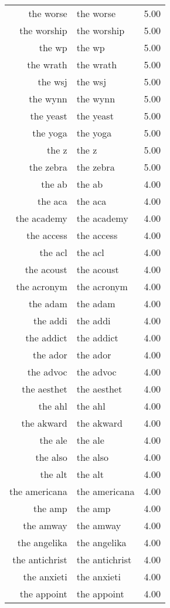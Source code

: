 \begin{table}[ht]
\begin{tabular}{rlr}
  the worse & the worse & 5.00 \\ 
  the worship & the worship & 5.00 \\ 
  the wp & the wp & 5.00 \\ 
  the wrath & the wrath & 5.00 \\ 
  the wsj & the wsj & 5.00 \\ 
  the wynn & the wynn & 5.00 \\ 
  the yeast & the yeast & 5.00 \\ 
  the yoga & the yoga & 5.00 \\ 
  the z & the z & 5.00 \\ 
  the zebra & the zebra & 5.00 \\ 
  the ab & the ab & 4.00 \\ 
  the aca & the aca & 4.00 \\ 
  the academy & the academy & 4.00 \\ 
  the access & the access & 4.00 \\ 
  the acl & the acl & 4.00 \\ 
  the acoust & the acoust & 4.00 \\ 
  the acronym & the acronym & 4.00 \\ 
  the adam & the adam & 4.00 \\ 
  the addi & the addi & 4.00 \\ 
  the addict & the addict & 4.00 \\ 
  the ador & the ador & 4.00 \\ 
  the advoc & the advoc & 4.00 \\ 
  the aesthet & the aesthet & 4.00 \\ 
  the ahl & the ahl & 4.00 \\ 
  the akward & the akward & 4.00 \\ 
  the ale & the ale & 4.00 \\ 
  the also & the also & 4.00 \\ 
  the alt & the alt & 4.00 \\ 
  the americana & the americana & 4.00 \\ 
  the amp & the amp & 4.00 \\ 
  the amway & the amway & 4.00 \\ 
  the angelika & the angelika & 4.00 \\ 
  the antichrist & the antichrist & 4.00 \\ 
  the anxieti & the anxieti & 4.00 \\ 
  the appoint & the appoint & 4.00 \\ 

\end{tabular}
\end{table}
